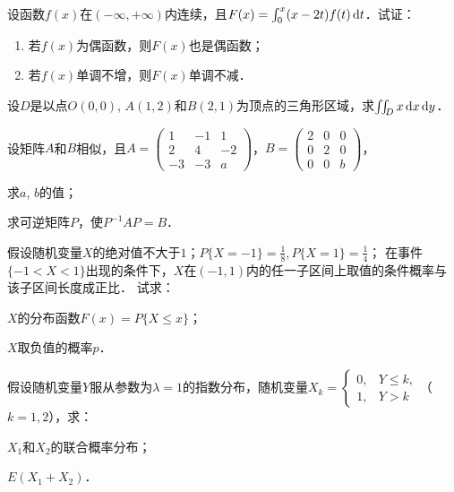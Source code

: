 \documentclass[plain,noanswer,medmath]{../../template/jnuexam}
\begin{document}

\begin{problem}
设函数$f(x)$在$(-\infty , +\infty)$内连续，且$F(x) = \int_0^x (x - 2t) f(t)\mathop{}\!\mathrm{d} t$．试证：
\begin{enumerate}
\item 若$f(x)$为偶函数，则$F(x)$也是偶函数；
\item 若$f(x)$单调不增，则$F(x)$单调不减．
\end{enumerate}
\end{problem}



\begin{problem}
设$D$是以点$O(0,0)$, $A(1,2)$和$B(2,1)$为顶点的三角形区域，求$\iint_Dx\mathop{}\!\mathrm{d} x\mathop{}\!\mathrm{d} y$．
\end{problem}






\begin{problem}
设矩阵$A$和$B$相似，且$A = \begin{pmatrix}
    1 & - 1 & 1 \\
    2 &   4 & - 2 \\
  - 3 & - 3 & a
\end{pmatrix}$，$B = \begin{pmatrix}
  2 & 0 & 0 \\
  0 & 2 & 0 \\
  0 & 0 & b
\end{pmatrix}$，\par
\begin{enumerate*}
\item 求$a$, $b$的值；
\item 求可逆矩阵$P$，使$P^{-1} AP = B$．
\end{enumerate*}
\end{problem}



\begin{problem}
假设随机变量$X$的绝对值不大于$1$；$P\{X = - 1\} = \frac{1}{8},P\{X = 1\} = \frac{1}{4}$；
在事件$\{- 1 < X < 1\}$出现的条件下，$X$在$(- 1,1)$内的任一子区间上取值的条件概率与该子区间长度成正比．
试求：\par
\begin{enumerate*}
\item $X$的分布函数$F(x) = P\{X \le x\}$；
\item $X$取负值的概率$p$．
\end{enumerate*}
\end{problem}



\begin{problem}
假设随机变量$Y$服从参数为$\lambda = 1$的指数分布，随机变量$X_k = \begin{cases}
  0, & Y \le k, \\
  1, & Y > k
\end{cases}$（$k = 1,2$），求：
\begin{enumerate*}
\item $X_1$和$X_2$的联合概率分布；
\item $E(X_1 + X_2)$．
\end{enumerate*}
\end{problem}
\end{document}
